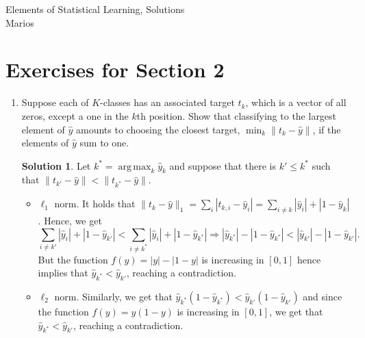 \documentclass[]{book}
\theoremstyle{definition}
\newtheorem*{soln}{Solution}
\DeclareMathOperator*{\argmax}{arg\,max}
\begin{document}
\begin{center}
	{\Large Elements of Statistical Learning, Solutions}\\
	Marios\\ %
\end{center}

\vspace{0.2 cm}


\section*{Exercises for Section 2}

\begin{enumerate}
	\item\label{ex:k-classes} Suppose each of $K$-classes has an associated
	target $t_k$, which is a vector of all zeros, except a one in the $k$th
	position. Show that classifying to the largest element of $\hat{y}$ amounts
	to choosing the closest target, $\min_k\|t_k-\hat{y}\|$, if the elements of
	$\hat{y}$ sum to one.
	\begin{soln}
		\newcommand{\normone}[1]{\sum_{i\ne #1}|\hat{y}_i|+|1-\hat{y}_{#1}|} Let
		$k^*=\argmax_k \hat{y}_k$ and suppose that there is $k'\le k^*$ such
		that $\|t_{k'}-\hat{y}\| < \|t_{k^*}-\hat{y}\|$.
		\begin{itemize}
			\item $\ell_1$ norm. It holds that
			      $\|t_k-\hat{y}\|_1=\sum_i|t_{k,i}-\hat{y}_i|=\sum_{i\ne
					      k}|\hat{y}_i|+|1-\hat{y}_k|$. Hence, we get
			      \begin{equation}\label{2.1-inequality}
				      \normone{k'} < \normone{k^*}\Rightarrow |\hat{y}_{k^*}|-|1-\hat{y}_{k^*}|
				      < |\hat{y}_{k'}|-|1-\hat{y}_{k'}|.
			      \end{equation}
			      But the function $f(y)=|y|-|1-y|$ is increasing in $[0,1]$
			      hence~ implies that
			      $\hat{y}_{k^*}<\hat{y}_{k'}$, reaching a contradiction.
			\item $\ell_2$ norm. Similarly, we get that
			      $\hat{y}_{k^*}(1-\hat{y}_{k^*})<\hat{y}_{k'}(1-\hat{y}_{k'})$
			      and since the function $f(y)=y(1-y)$ is increasing in $[0,1]$,
			      we get that $\hat{y}_{k^*}<\hat{y}_{k'}$, reaching a
			      contradiction.
		\end{itemize}
	\end{soln}


\end{enumerate}
\end{document}
